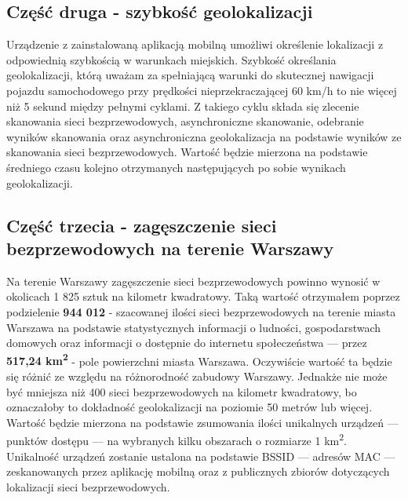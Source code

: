 \subsection{Część druga - szybkość geolokalizacji}
Urządzenie z zainstalowaną aplikacją mobilną umożliwi określenie lokalizacji z odpowiednią szybkością w warunkach miejskich. Szybkość określania geolokalizacji, którą uważam za spełniającą warunki do skutecznej nawigacji pojazdu samochodowego przy prędkości nieprzekraczającej 60 km/h to nie więcej niż 5 sekund między pełnymi cyklami. Z takiego cyklu składa się zlecenie skanowania sieci bezprzewodowych, asynchroniczne skanowanie, odebranie wyników skanowania oraz asynchroniczna geolokalizacja na podstawie wyników ze skanowania sieci bezprzewodowych. Wartość będzie mierzona na podstawie średniego czasu kolejno otrzymanych następujących po sobie wynikach geolokalizacji.

\subsection{Część trzecia - zagęszczenie sieci bezprzewodowych na terenie Warszawy}
Na terenie Warszawy zagęszczenie sieci bezprzewodowych powinno wynosić w okolicach 1 825 sztuk na kilometr kwadratowy. Taką wartość otrzymałem poprzez podzielenie \textbf{944 012} - szacowanej ilości sieci bezprzewodowych na terenie miasta Warszawa na podstawie statystycznych informacji o ludności, gospodarstwach domowych oraz informacji o dostępnie do internetu społeczeństwa — przez \textbf{517,24 km\textsuperscript{2}} - pole powierzchni miasta Warszawa. Oczywiście wartość ta będzie się różnić ze względu na różnorodność zabudowy Warszawy. Jednakże nie może być mniejsza niż 400 sieci bezprzewodowych na kilometr kwadratowy, bo oznaczałoby to dokładność geolokalizacji na poziomie 50 metrów lub więcej. Wartość będzie mierzona na podstawie zsumowania ilości unikalnych urządzeń — punktów dostępu — na wybranych kilku obszarach o rozmiarze 1 km\textsuperscript{2}. Unikalność urządzeń zostanie ustalona na podstawie BSSID — adresów MAC — zeskanowanych przez aplikację mobilną oraz z publicznych zbiorów dotyczących lokalizacji sieci bezprzewodowych.
